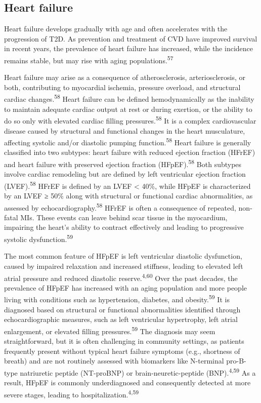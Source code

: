 \documentclass[
  a4paper,
  headsepline=true,
  open=any]{scrbook}
\begin{document}
\hypertarget{heart-failure}{%
\subsection{Heart failure}\label{heart-failure}}

Heart failure develops gradually with age and often accelerates with the
progression of T2D. As prevention and treatment of CVD have improved
survival in recent years, the prevalence of heart failure has increased,
while the incidence remains stable, but may rise with aging
populations.\textsuperscript{57}

Heart failure may arise as a consequence of atherosclerosis,
arteriosclerosis, or both, contributing to myocardial ischemia, pressure
overload, and structural cardiac changes.\textsuperscript{58} Heart
failure can be defined hemodynamically as the inability to maintain
adequate cardiac output at rest or during exertion, or the ability to do
so only with elevated cardiac filling pressures.\textsuperscript{58} It
is a complex cardiovascular disease caused by structural and functional
changes in the heart musculature, affecting systolic and/or diastolic
pumping function.\textsuperscript{58} Heart failure is generally
classified into two subtypes: heart failure with reduced ejection
fraction (HFrEF) and heart failure with preserved ejection fraction
(HFpEF).\textsuperscript{58} Both subtypes involve cardiac remodeling
but are defined by left ventricular ejection fraction
(LVEF).\textsuperscript{58} HFrEF is defined by an LVEF \textless{}
40\%, while HFpEF is characterized by an LVEF ≥ 50\% along with
structural or functional cardiac abnormalities, as assessed by
echocardiography.\textsuperscript{58} HFrEF is often a consequence of
repeated, non-fatal MIs. These events can leave behind scar tissue in
the myocardium, impairing the heart's ability to contract effectively
and leading to progressive systolic dysfunction.\textsuperscript{59}

The most common feature of HFpEF is left ventricular diastolic
dysfunction, caused by impaired relaxation and increased stiffness,
leading to elevated left atrial pressure and reduced diastolic
reserve.\textsuperscript{4,60} Over the past decades, the prevalence of
HFpEF has increased with an aging population and more people living with
conditions such as hypertension, diabetes, and
obesity.\textsuperscript{59} It is diagnosed based on structural or
functional abnormalities identified through echocardiographic measures,
such as left ventricular hypertrophy, left atrial enlargement, or
elevated filling pressures.\textsuperscript{59} The diagnosis may seem
straightforward, but it is often challenging in community settings, as
patients frequently present without typical heart failure symptoms
(e.g., shortness of breath) and are not routinely assessed with
biomarkers like N-terminal pro-B-type natriuretic peptide (NT-proBNP) or
brain-neuretic-peptide (BNP).\textsuperscript{4,59} As a result, HFpEF
is commonly underdiagnosed and consequently detected at more severe
stages, leading to hospitalization.\textsuperscript{4,59}
\end{document}
